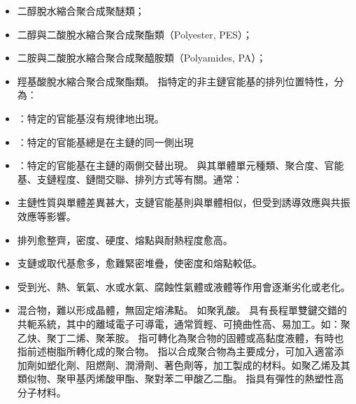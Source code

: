 \documentclass[a4paper,12pt]{report}
\begin{document}
\begin{itemize}
\begin{itemize}
\item 二醇脫水縮合聚合成聚醚類；
\item 二醇與二酸脫水縮合聚合成聚酯類（Polyester, PES）；
\item 二胺與二酸脫水縮合聚合成聚醯胺類（Polyamides, PA）；
\item 羥基酸脫水縮合聚合成聚酯類。
\eit
{}
指特定的非主鏈官能基的排列位置特性，分為：
\bit
\item {}：特定的官能基沒有規律地出現。
\item {}：特定的官能基總是在主鏈的同一側出現
\item {}：特定的官能基在主鏈的兩側交替出現。
\eit
{}
與其單體單元種類、聚合度、官能基、支鏈程度、鏈間交聯、排列方式等有關。通常：
\bit
\item 主鏈性質與單體差異甚大，支鏈官能基則與單體相似，但受到誘導效應與共振效應等影響。
\item 排列愈整齊，密度、硬度、熔點與耐熱程度愈高。
\item 支鏈或取代基愈多，愈難緊密堆疊，使密度和熔點較低。
\item 受到光、熱、氧氣、水或水氣、腐蝕性氣體或液體等作用會逐漸劣化或老化。
\item 混合物，難以形成晶體，無固定熔沸點。
\eit
{}
如聚乳酸。
具有長程單雙鍵交錯的共軛系統，其中的離域電子可導電，通常質輕、可撓曲性高、易加工。如：聚乙炔、聚丁二烯、聚苯胺。
指可轉化為聚合物的固體或高黏度液體，有時也指前述樹脂所轉化成的聚合物。
指以合成聚合物為主要成分，可加入適當添加劑如塑化劑、阻燃劑、潤滑劑、著色劑等，加工製成的材料。如聚乙烯及其類似物、聚甲基丙烯酸甲酯、聚對苯二甲酸乙二酯。
指具有彈性的熱塑性高分子材料。

\end{itemize}
\end{itemize}
\end{document}

